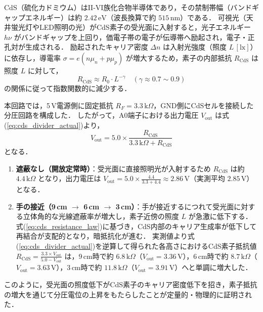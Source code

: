 CdS（硫化カドミウム）はII-VI族化合物半導体であり，その禁制帯幅（バンドギャップエネルギー）は約 $2.42\,\mathrm{eV}$（波長換算で約 $515\,\mathrm{nm}$）である\cite{川口慎一朗1966cds, 石川太郎1974照明制御システムへの半導体応用}．
可視光（天井蛍光灯やLED照明の光）がCdS素子の受光面に入射すると，光子エネルギー $h\nu$ がバンドギャップを上回り，価電子帯の電子が伝導帯へ励起され，電子・正孔対が生成される．
励起されたキャリア密度 $\Delta n$ は入射光強度（照度 $L\,\mathrm{[lx]}$）に依存し，導電率 $\sigma = e(n\mu_n + p\mu_p)$ が増大するため，素子の内部抵抗 $R_{\mathrm{CdS}}$ は照度 $L$ に対して，
\begin{equation}
    R_{\mathrm{CdS}} \approx R_0 \cdot L^{-\gamma} \quad (\gamma \approx 0.7 \sim 0.9)
    \label{eq:cds_resistance_law}
\end{equation}
の関係に従って指数関数的に減少する\cite{石川太郎1974照明制御システムへの半導体応用}．

本回路では，5\,V電源側に固定抵抗 $R_F = 3.3\,\mathrm{k}\Omega$，GND側にCdSセルを接続した分圧回路を構成した．
したがって，A0端子における出力電圧 $V_{\mathrm{out}}$ は式(\ref{eq:cds_divider_actual})より，
\begin{equation}
    V_{\mathrm{out}} = 5.0 \times \frac{R_{\mathrm{CdS}}}{3.3\,\mathrm{k}\Omega + R_{\mathrm{CdS}}}
\end{equation}
となる．
\begin{enumerate}
    \item \textbf{遮蔽なし（開放定常時）}：受光面に直接照明光が入射するため $R_{\mathrm{CdS}}$ は約 $4.4\,\mathrm{k}\Omega$ となり，出力電圧は $V_{\mathrm{out}} = 5.0 \times \frac{4.4}{3.3 + 4.4} \approx 2.86\,\mathrm{V}$（実測平均 $2.85\,\mathrm{V}$）となる．
    \item \textbf{手の接近（9\,cm $\to$ 6\,cm $\to$ 3\,cm）}：手が接近するにつれて受光面に対する立体角的な光線遮蔽率が増大し，素子近傍の照度 $L$ が急激に低下する．式(\ref{eq:cds_resistance_law})に基づき，CdS内部のキャリア生成率が低下して再結合が支配的となり，暗抵抗化が進む．
    実測値より式(\ref{eq:cds_divider_actual})を逆算して得られた各高さにおけるCdS素子抵抗値 $R_{\mathrm{CdS}} = \frac{3.3 \times V_{\mathrm{out}}}{5.0 - V_{\mathrm{out}}}$ は，9\,cm時で約 $6.8\,\mathrm{k}\Omega$（$V_{\mathrm{out}} = 3.36\,\mathrm{V}$），6\,cm時で約 $8.7\,\mathrm{k}\Omega$（$V_{\mathrm{out}} = 3.63\,\mathrm{V}$），3\,cm時で約 $11.8\,\mathrm{k}\Omega$（$V_{\mathrm{out}} = 3.91\,\mathrm{V}$）へと単調に増大した．
\end{enumerate}
このように，受光面の照度低下がCdS素子のキャリア密度低下を招き，素子抵抗の増大を通じて分圧電位の上昇をもたらしたことが定量的・物理的に証明された．


